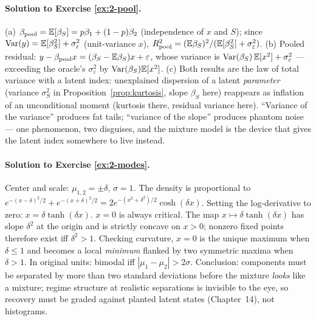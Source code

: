 \paragraph{Solution to Exercise \ref{ex:2-pool}.}
(a) $\beta_{\mathrm{pool}} = \mathbb{E}[\beta_S] = p\beta_1 + (1-p)\beta_2$
(independence of $x$ and $S$); since
$\operatorname{Var}(y) = \mathbb{E}[\beta_S^2] + \sigma_\varepsilon^2$ (unit-variance $x$),
$R^2_{\mathrm{pool}} = (\mathbb{E}\beta_S)^2 / (\mathbb{E}[\beta_S^2] +
\sigma_\varepsilon^2)$. (b) Pooled residual:
$y - \beta_{\mathrm{pool}}x = (\beta_S - \mathbb{E}\beta_S)x + \varepsilon$, whose
variance is $\operatorname{Var}(\beta_S)\,\mathbb{E}[x^2] + \sigma_\varepsilon^2$ --- exceeding
the oracle's $\sigma_\varepsilon^2$ by $\operatorname{Var}(\beta_S)\mathbb{E}[x^2]$. (c) Both
results are the law of total variance with a latent index: unexplained
dispersion of a latent \emph{parameter} (variance $\sigma_S^2$ in
Proposition~\ref{prop:kurtosis}, slope $\beta_S$ here) reappears as
inflation of an unconditional moment (kurtosis there, residual variance
here). ``Variance of the variance'' produces fat tails; ``variance of the
slope'' produces phantom noise --- one phenomenon, two disguises, and the
mixture model is the device that gives the latent index somewhere to live
instead.

\paragraph{Solution to Exercise \ref{ex:2-modes}.}
Center and scale: $\mu_{1,2} = \pm\delta$, $\sigma = 1$. The density is
proportional to
$e^{-(x-\delta)^2/2} + e^{-(x+\delta)^2/2}
= 2e^{-(x^2+\delta^2)/2}\cosh(\delta x)$. Setting the log-derivative to
zero: $x = \delta \tanh(\delta x)$. $x = 0$ is always critical. The map
$x \mapsto \delta\tanh(\delta x)$ has slope $\delta^2$ at the origin and is
strictly concave on $x > 0$; nonzero fixed points therefore exist iff
$\delta^2 > 1$. Checking curvature, $x = 0$ is the unique maximum when
$\delta \le 1$ and becomes a local \emph{minimum} flanked by two symmetric
maxima when $\delta > 1$. In original units: bimodal iff
$|\mu_1 - \mu_2| > 2\sigma$. Conclusion: components must be separated by
more than two standard deviations before the mixture \emph{looks} like a
mixture; regime structure at realistic separations is invisible to the
eye, so recovery must be graded against planted latent states
(Chapter~14), not histograms.

